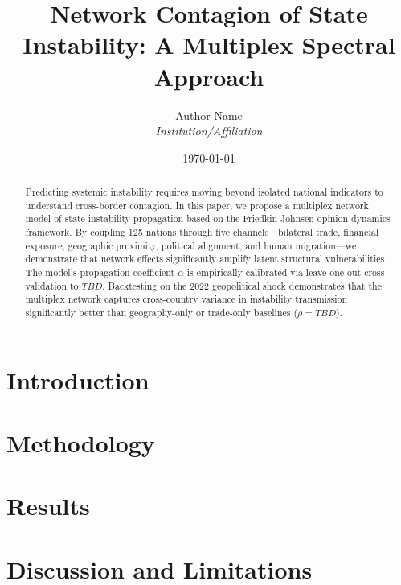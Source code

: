\documentclass[12pt,a4paper]{article}
\title{Network Contagion of State Instability: A Multiplex Spectral Approach}
\author{Author Name \\ \textit{Institution/Affiliation}}
\date{\today}
\newcommand{\OptimalAlpha}{TBD}
\newcommand{\BacktestSpearman}{TBD}
\begin{document}
\maketitle

\begin{abstract}
Predicting systemic instability requires moving beyond isolated national indicators to understand cross-border contagion. In this paper, we propose a multiplex network model of state instability propagation based on the Friedkin-Johnsen opinion dynamics framework. By coupling 125 nations through five channels—bilateral trade, financial exposure, geographic proximity, political alignment, and human migration—we demonstrate that network effects significantly amplify latent structural vulnerabilities. The model's propagation coefficient $\alpha$ is empirically calibrated via leave-one-out cross-validation to $\OptimalAlpha$. Backtesting on the 2022 geopolitical shock demonstrates that the multiplex network captures cross-country variance in instability transmission significantly better than geography-only or trade-only baselines ($\rho = \BacktestSpearman$).
\end{abstract}

\section{Introduction}


\section{Methodology}


\section{Results}


\section{Discussion and Limitations}




\end{document}
